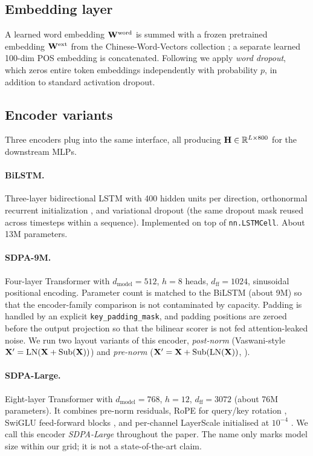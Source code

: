 \subsection{Embedding layer}
\label{sec:method-embedding}

A learned word embedding $\mathbf{W}^{\text{word}}$ is summed with a frozen pretrained embedding $\mathbf{W}^{\text{ext}}$ from the Chinese-Word-Vectors collection \citep{li2018cwv}; a separate learned 100-dim POS embedding is concatenated. Following \citet{dozat2017biaffine} we apply \emph{word dropout}, which zeros entire token embeddings independently with probability $p$, in addition to standard activation dropout.

\subsection{Encoder variants}
\label{sec:method-encoder}

Three encoders plug into the same interface, all producing $\mathbf{H}\in\mathbb{R}^{L\times 800}$ for the downstream MLPs.

\paragraph{BiLSTM.} Three-layer bidirectional LSTM with 400 hidden units per direction, orthonormal recurrent initialization \citep{dozat2017biaffine}, and variational dropout (the same dropout mask reused across timesteps within a sequence). Implemented on top of \texttt{nn.LSTMCell}. About 13M parameters.

\paragraph{SDPA-9M.} Four-layer Transformer with $d_{\text{model}}=512$, $h=8$ heads, $d_{\text{ff}}=1024$, sinusoidal positional encoding. Parameter count is matched to the BiLSTM (about 9M) so that the encoder-family comparison is not contaminated by capacity. Padding is handled by an explicit \texttt{key\_padding\_mask}, and padding positions are zeroed before the output projection so that the bilinear scorer is not fed attention-leaked noise. We run two layout variants of this encoder, \emph{post-norm} (Vaswani-style $\mathbf{X}'=\text{LN}(\mathbf{X}+\text{Sub}(\mathbf{X}))$) and \emph{pre-norm} ($\mathbf{X}'=\mathbf{X}+\text{Sub}(\text{LN}(\mathbf{X}))$, \citealt{xiong2020lnorder}).

\paragraph{SDPA-Large.} Eight-layer Transformer with $d_{\text{model}}=768$, $h=12$, $d_{\text{ff}}=3072$ (about 76M parameters). It combines pre-norm residuals, RoPE for query/key rotation \citep{su2021roformer}, SwiGLU feed-forward blocks \citep{shazeer2020glu}, and per-channel LayerScale initialised at $10^{-4}$ \citep{touvron2021cait}. We call this encoder \emph{SDPA-Large} throughout the paper. The name only marks model size within our grid; it is not a state-of-the-art claim.

